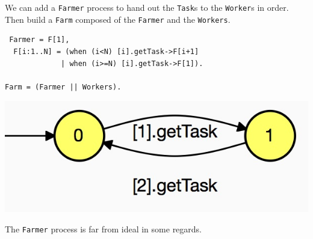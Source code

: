 \documentclass[]{article}
\begin{document}
 We can add a \verb$Farmer$ process to hand out the \verb$Task$s to the \verb$Worker$s in order. Then  build a \verb$Farm$ composed of the \verb$Farmer$ and the \verb$Workers$.
 
\begin{center}\begin{minipage}{0.55\textwidth}
\begin{verbatim}
 Farmer = F[1],
  F[i:1..N] = (when (i<N) [i].getTask->F[i+1]
             | when (i>=N) [i].getTask->F[1]).

Farm = (Farmer || Workers).
   \end{verbatim} 
\end{minipage}\begin{minipage}{0.4\textwidth}
\begin{center}\includegraphics[scale=0.275]{Farmer.jpg}\end{center}
\end{minipage}
\end{center}

The \verb$Farmer$  process is far from ideal in some regards.
\end{document}
